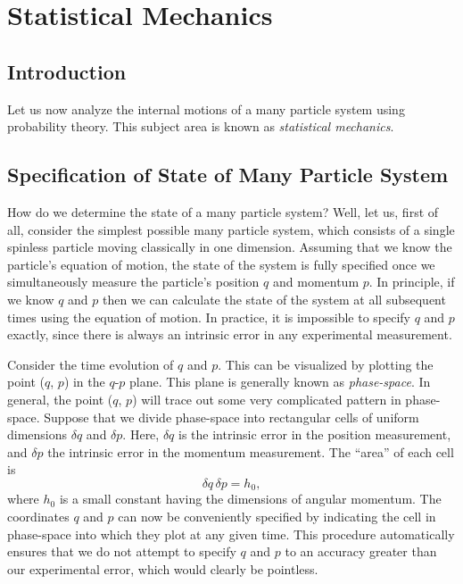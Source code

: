 \chapter{Statistical Mechanics}\label{s3}

\section{Introduction}
Let us now analyze the internal motions of a many particle  system
using probability theory. This
subject area is known as {\em statistical mechanics}.
 
\section{Specification of State of Many Particle System}\label{s3.6}
How do we determine the state of a many particle system? Well, let us, first
of all,
consider the simplest possible many particle system, which consists of a
single spinless particle moving classically in one dimension. Assuming that we know
the particle's equation of motion, the state of the system is fully
specified once we simultaneously measure
the particle's position $q$ and momentum $p$. 
In principle, if we know $q$ and $p$ then 
we can calculate the state of the system at all subsequent times using the
equation of motion.
In practice, it is impossible to specify 
$q$ and $p$ exactly, since there is always an intrinsic error in any experimental
measurement. 

Consider the time evolution of $q$ and $p$.
 This can be visualized by plotting
the point ($q$, $p$)  in the
$q$-$p$ plane. This plane is generally known as {\em phase-space}. In general,
the point ($q$, $p$) will trace out some very complicated pattern in
phase-space.
Suppose that we divide phase-space  into rectangular cells  of uniform dimensions
$\delta q$ and $\delta p$. 
Here, $\delta q$  is the intrinsic error in the position measurement, and 
$\delta p$
the intrinsic error in the momentum measurement. The ``area'' of each cell
 is
\begin{equation}
\delta q\, \delta p = h_0,
\end{equation}
where $h_0$ is a small constant having the dimensions of angular momentum.
The  coordinates $q$ and $p$ can now be
conveniently  specified   by indicating
 the cell in phase-space into which they plot   at any given time. 
This procedure automatically ensures that we do not attempt to specify
$q$ and $p$  to an accuracy greater than our experimental error, which would
clearly be pointless.

